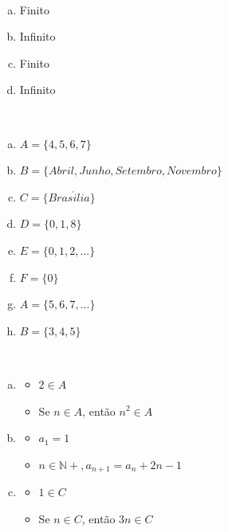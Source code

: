 \begin{Gabarito}{1}
~
        \begin{multicols}{4}
        \begin{enumerate}[a)]
            \item Finito
            \item Infinito
            \item Finito
            \item Infinito
        \end{enumerate}
    \end{multicols}

    
\end{Gabarito}
\begin{Gabarito}{2}
~
    \begin{multicols}{2}
    \begin{enumerate}[a)]
        \item $A = \{ 4, 5, 6, 7\}$
        \item $B = \{ Abril, Junho, Setembro, Novembro \}$
        \item $C = \{Bras\acute{i}lia\}$
        \item $D = \{ 0, 1, 8\}$
        \item $E = \{0, 1, 2, ...\}$
        \item $F = \{ 0 \}$
        \item $A = \{ 5, 6, 7, ...\}$
        \item $B = \{ 3, 4, 5\}$
    \end{enumerate}
\end{multicols}

\end{Gabarito}
\begin{Gabarito}{3}
~

    \begin{enumerate}[a)]
        \item

        \begin{itemize}
                \item $2 \in A$
                \item Se $n \in A$, então $n^2 \in A$
            \end{itemize}

        \item

            \begin{itemize}
                    \item $a_1 = 1$
                    \item $n \in \mathbb{N+}, a_{n+1} = a_{n} + 2n - 1$
                \end{itemize}

        \item

        \begin{itemize}
                \item $1 \in C$
                \item Se $n \in C$, então $3n \in C$
            \end{itemize}
    \end{enumerate}
\end{Gabarito}
